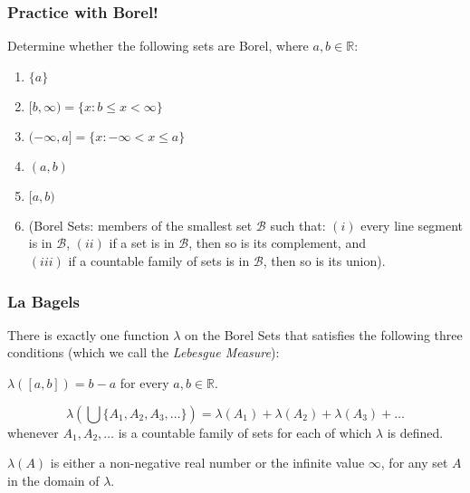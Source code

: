 \begin{frame}
\frametitle{Practice with Borel!}

Determine whether the following sets are Borel, where $a, b \in \mathbb{R}$:

\begin{enumerate}[<+->]

\item $\{a \}$

\item $[b, \infty) = \{ x : b \leq x < \infty \}$

\item $(-\infty, a] = \{ x : -\infty < x \leq a \}$

\item $(a, b)$

\item $[a, b) $

\item[] {\small (Borel Sets: members of the smallest set $\mathscr{B}$ such that: $(i)$ every line segment is in $\mathscr{B}$, $(ii)$ if a set is in $\mathscr{B}$, then so is its complement, and \\ $(iii)$ if a countable family of sets is in $\mathscr{B}$, then so is its union).}

\end{enumerate}
\end{frame}

\begin{frame}
\frametitle{La Bagels}

There is exactly one function \emph{$\lambda$} on the Borel Sets that satisfies the following three conditions (which we call the \emph{Lebesgue Measure}):\label{gloss:leb-measurable}

\begin{description}[<+->]
\item[Length on Segments] $\lambda([a,b]) = b-a$ for every $a,b \in \mathbb{R}$.\label{gloss:lls}



\item[Countable Additivity]
\[\lambda\left(\bigcup\{A_1,  A_2 , A_3,\ldots\}\right) = \lambda(A_1) + \lambda(A_2) + \lambda(A_3) + \ldots\] whenever $A_1,A_2,\dots$ is a countable family of  sets for each of which $\lambda$ is defined.\label{gloss:count-add-measure}



\item[Non-Negativity]
$\lambda(A)$ is either a non-negative real number or the infinite value $\infty$, for any set $A$ in the domain of $\lambda$.\label{gloss:non-neg}

 \end{description}
\end{frame}

